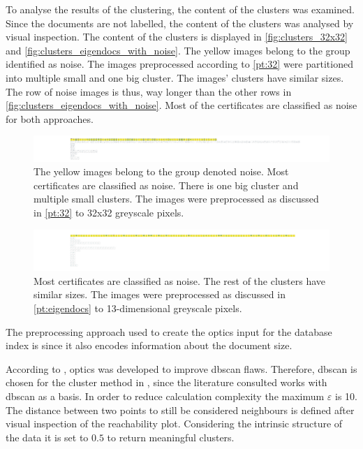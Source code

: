 To analyse the results of the clustering, the content of the clusters was examined.
Since the documents are not labelled, the content of the clusters was analysed by visual inspection.
The content of the clusters is displayed in \autoref{fig:clusters_32x32} and \autoref{fig:clusters_eigendocs_with_noise}.
The yellow images belong to the group identified as noise.
The images preprocessed according to \autoref{pt:32} were partitioned into multiple small and one big cluster.
The \eigendocs{} images' clusters have similar sizes. 
The row of noise images is thus, way longer than the other rows in \autoref{fig:clusters_eigendocs_with_noise}.
Most of the certificates are classified as noise for both approaches.


\begin{figure}[htp] %
    \centering
    \includegraphics[width=1.05\textwidth]{images/OPTICS/32x32/cluster_content_32x32.pdf}
    \caption{The yellow images belong to the group denoted noise.
    Most certificates are classified as noise.
    There is one big cluster and multiple small clusters.
    The images were preprocessed as discussed in \autoref{pt:32} to 32x32 greyscale pixels.
    }
    \label{fig:clusters_32x32}
\end{figure}

\begin{figure}[htp] %
    \centering
    \includegraphics[width=1.05\textwidth]{images/OPTICS/eigendocs/cluster_content_incl_noise_Eigendocs.pdf}
    \caption{Most certificates are classified as noise. The rest of the clusters have similar sizes.
    The images were preprocessed as discussed in \autoref{pt:eigendocs} to 13-dimensional greyscale pixels.
    }
    \label{fig:clusters_eigendocs_with_noise}
\end{figure}


The preprocessing approach used to create the \ac{optics} input for the \databaseName{} database index is \eigendocs{} since it also encodes information about the document size. 

According to \citeauthor{OPTICS2014}, \ac{optics} was developed to improve \ac{dbscan} flaws.
Therefore, \ac{dbscan} is chosen for the cluster method in , since the literature consulted works with \ac{dbscan} as a basis.
In order to reduce calculation complexity the maximum $\varepsilon$ is 10.
The distance between two points to still be considered neighbours is defined after visual inspection of the reachability plot.
Considering the intrinsic structure of the data it is set to $0.5$ to return meaningful clusters.